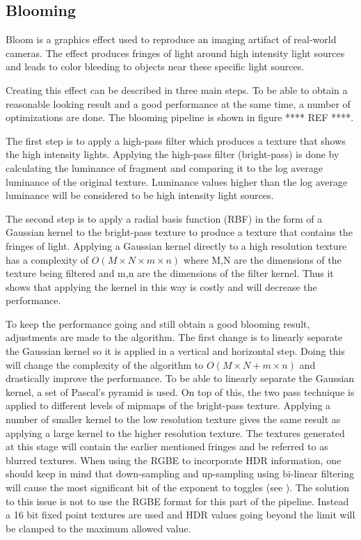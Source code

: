 \documentclass[twocolumn,8pt]{article}
\begin{document}
\subsection{Blooming}
Bloom is a graphics effect used to reproduce an imaging artifact of real-world cameras. The effect produces fringes of light around high intensity light sources and leads to color bleeding to objects near these specific light sources. 

Creating this effect can be described in three main steps. To be able to obtain a reasonable looking result and a good performance at the same time, a number of optimizations are done.  The blooming pipeline is shown in figure **** REF ****.

The first step is to apply a high-pass filter which produces a texture that shows the high intensity lights. Applying the high-pass filter (bright-pass) is done by calculating the luminance of fragment and comparing it to the log average luminance of the original texture. Luminance values higher than the log average luminance will be considered to be high intensity light sources.

The second step is to apply a radial basis function (RBF) in the form of a Gaussian kernel to the bright-pass texture to produce a texture that contains the fringes of light. Applying a Gaussian kernel directly to a high resolution texture has a complexity of $O \left ( M \times N \times m \times n  \right )$ where M,N are the dimensions of the texture being filtered and m,n are the dimensions of the filter kernel. Thus it shows that applying the kernel in this way is costly and will decrease the performance. 

To keep the performance going and still obtain a good blooming result, adjustments are made to the algorithm. The first change is to linearly separate the Gaussian kernel so it is applied in a vertical and horizontal step. Doing this will change the complexity of the algorithm to $O \left ( M \times N + m \times n  \right )$ and drastically improve the performance. To be able to linearly separate the Gaussian kernel, a set of Pascal's pyramid is used. On top of this, the two pass technique is applied to different levels of mipmaps of the bright-pass texture. Applying a number of smaller kernel to the low resolution texture gives the same result as applying a large kernel to the higher resolution texture. The textures generated at this stage will contain the earlier mentioned fringes and be referred to as blurred textures. When using the RGBE to incorporate HDR information, one should keep in mind that down-sampling and up-sampling using bi-linear filtering will cause the most significant bit of the exponent to toggles (see \cite{hdrTexturing}). The solution to this issue is not to use the RGBE format for this part of the pipeline. Instead a 16 bit fixed point textures are used and HDR values going beyond the limit will be clamped to the maximum allowed value.
\end{document}

